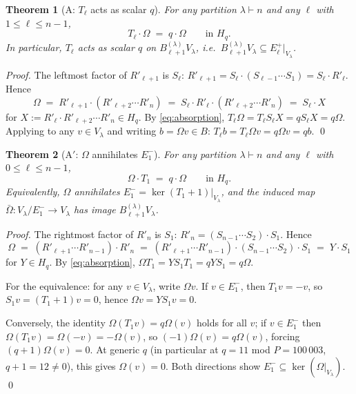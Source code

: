 \documentclass[11pt]{article}
\newtheorem{theorem}{Theorem}
\theoremstyle{definition}
\newcommand{\Hq}{H_q}
\newcommand{\Bdec}{B_{\ell+1}^{(\lambda)}}
\newcommand{\Om}{\Omega}
\begin{document}
\begin{theorem}[A: $T_\ell$ acts as scalar $q$]\label{thm:A}
For any partition $\lambda \vdash n$ and any $\ell$ with $1 \le \ell \le n-1$,
\[
   T_\ell \cdot \Om \;=\; q \cdot \Om \qquad \text{in } \Hq.
\]
In particular, $T_\ell$ acts as scalar $q$ on $\Bdec V_\lambda$,
i.e.\ $\Bdec V_\lambda \subseteq E_\ell^+|_{V_\lambda}$.
\end{theorem}

\begin{proof}
The leftmost factor of $R'_{\ell+1}$ is $S_\ell$:
$R'_{\ell+1} = S_\ell \cdot (S_{\ell-1} \cdots S_1) = S_\ell \cdot R'_\ell$.
Hence
\[
   \Om \;=\; R'_{\ell+1} \cdot (R'_{\ell+2} \cdots R'_n)
       \;=\; S_\ell \cdot R'_\ell \cdot (R'_{\ell+2} \cdots R'_n)
       \;=\; S_\ell \cdot X
\]
for $X := R'_\ell \cdot R'_{\ell+2} \cdots R'_n \in \Hq$. By
\eqref{eq:absorption},
$T_\ell \Om = T_\ell S_\ell X = q S_\ell X = q \Om$. Applying to any
$v \in V_\lambda$ and writing $b = \Om v \in B$:
$T_\ell b = T_\ell \Om v = q \Om v = q b$. \qed
\end{proof}

\begin{theorem}[A$'$: $\Om$ annihilates $E_1^-$]\label{thm:A-prime}
For any partition $\lambda \vdash n$ and any $\ell$ with $0 \le \ell \le n-1$,
\[
   \Om \cdot T_1 \;=\; q \cdot \Om \qquad \text{in } \Hq.
\]
Equivalently, $\Om$ annihilates $E_1^- = \ker(T_1+1)|_{V_\lambda}$, and
the induced map $\bar\Om: V_\lambda / E_1^- \to V_\lambda$ has image
$\Bdec V_\lambda$.
\end{theorem}

\begin{proof}
The rightmost factor of $R'_n$ is $S_1$:
$R'_n = (S_{n-1} \cdots S_2) \cdot S_1$. Hence
\[
   \Om \;=\; (R'_{\ell+1} \cdots R'_{n-1}) \cdot R'_n
       \;=\; (R'_{\ell+1} \cdots R'_{n-1}) \cdot (S_{n-1} \cdots S_2) \cdot S_1
       \;=\; Y \cdot S_1
\]
for $Y \in \Hq$. By \eqref{eq:absorption},
$\Om T_1 = Y S_1 T_1 = q Y S_1 = q \Om$.

For the equivalence: for any $v \in V_\lambda$, write $\Om v$. If
$v \in E_1^-$, then $T_1 v = -v$, so $S_1 v = (T_1+1) v = 0$, hence
$\Om v = Y S_1 v = 0$.

Conversely, the identity $\Om(T_1 v) = q \Om(v)$ holds for all $v$;
if $v \in E_1^-$ then $\Om(T_1 v) = \Om(-v) = -\Om(v)$, so
$(-1)\Om(v) = q \Om(v)$, forcing $(q+1)\Om(v) = 0$. At generic $q$
(in particular at $q = 11$ mod $P = 100\,003$, $q+1 = 12 \ne 0$),
this gives $\Om(v) = 0$. Both directions show $E_1^- \subseteq \ker(\Om|_{V_\lambda})$.
\qed
\end{proof}
\end{document}
